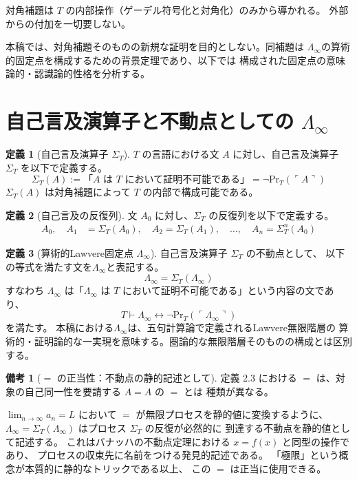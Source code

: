 \documentclass[11pt,a4paper]{ltjsarticle}
\theoremstyle{definition}
\newtheorem{definition}{定義}[section]
\newtheorem{remark}{備考}[section]
\newcommand{\LawvereInfinity}{\Lambda_\infty}
\newcommand{\SelfRef}{\Sigma}
\renewcommand{\Pr}{\mathrm{Pr}}
\begin{document}
対角補題は $T$ の内部操作（ゲーデル符号化と対角化）のみから導かれる。
外部からの付加を一切要しない。

本稿では、対角補題そのものの新規な証明を目的としない。同補題は
$\LawvereInfinity$の算術的固定点を構成するための背景定理であり、以下では
構成された固定点の意味論的・認識論的性格を分析する。

\section{自己言及演算子と不動点としての
\texorpdfstring{$\LawvereInfinity$}{Lambda-infinity}}

\begin{definition}[自己言及演算子 $\SelfRef_T$]
$T$ の言語における文 $A$ に対し、自己言及演算子 $\SelfRef_T$ を以下で定義する。
$$\SelfRef_T(A) := \text{「$A$ は $T$ において証明不可能である」}
    = \neg \Pr_T(\ulcorner A \urcorner)$$
$\SelfRef_T(A)$ は対角補題によって $T$ の内部で構成可能である。
\end{definition}

\begin{definition}[自己言及の反復列]
文 $A_0$ に対し、$\SelfRef_T$ の反復列を以下で定義する。
\begin{align*}
A_0,\quad
A_1 &= \SelfRef_T(A_0),\quad
A_2 = \SelfRef_T(A_1),\quad \ldots,\quad
A_n = \SelfRef_T^n(A_0)
\end{align*}
\end{definition}

\begin{definition}[算術的Lawvere固定点 $\LawvereInfinity$]
自己言及演算子 $\SelfRef_T$ の不動点として、
以下の等式を満たす文を$\LawvereInfinity$と表記する。
$$\LawvereInfinity = \SelfRef_T(\LawvereInfinity)$$
すなわち $\LawvereInfinity$ は「$\LawvereInfinity$ は $T$ において証明不可能である」という内容の文であり、
$$T \vdash \LawvereInfinity \leftrightarrow \neg \Pr_T(\ulcorner \LawvereInfinity \urcorner)$$
を満たす。
本稿における$\LawvereInfinity$は、五句計算論で定義されるLawvere無限階層の
算術的・証明論的な一実現を意味する。圏論的な無限階層そのものの構成とは区別する。
\end{definition}

\begin{remark}[$=$ の正当性：不動点の静的記述として]
定義 2.3 における $=$ は、対象の自己同一性を要請する $A = A$ の $=$ とは
種類が異なる。

$\lim_{n \to \infty} a_n = L$ において $=$ が無限プロセスを静的値に変換するように、
$\LawvereInfinity = \SelfRef_T(\LawvereInfinity)$ はプロセス $\SelfRef_T$ の反復が必然的に
到達する不動点を静的値として記述する。
これはバナッハの不動点定理における $x = f(x)$ と同型の操作であり、
プロセスの収束先に名前をつける発見的記述である。
「極限」という概念が本質的に静的なトリックである以上、
この $=$ は正当に使用できる。
\end{remark}
\end{document}
